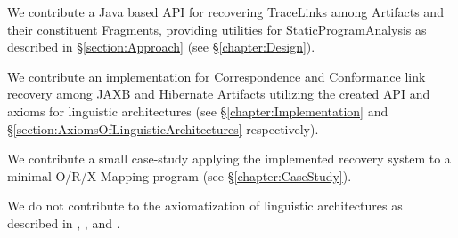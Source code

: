 \begin{contributions}

\item
We contribute a \gls{Java} based \gls{API} for recovering \glspl{TraceLink} among \glspl{Artifact} and their constituent \glspl{Fragment}, providing utilities for \gls{StaticProgramAnalysis} as described in §\ref{section:Approach} (see §\ref{chapter:Design}).

\item
We contribute an implementation for \gls{Correspondence} and \gls{Conformance} link recovery among \gls{JAXB} and \gls{Hibernate} \glspl{Artifact} utilizing the created \gls{API} and axioms for linguistic architectures (see §\ref{chapter:Implementation} and §\ref{section:AxiomsOfLinguisticArchitectures} respectively).

\item
We contribute a small case-study applying the implemented recovery system to a minimal \gls{O/R/X-Mapping} program (see §\ref{chapter:CaseStudy}).

\end{contributions}

\begin{noncontributions}

\item
We do not contribute to the axiomatization of linguistic architectures as described in \cite{DBLP:conf/ecmdafa/LammelV14}, \cite{DBLP:journals/entcs/FavreN05}, \cite{DBLP:conf/sle/Lammel16} and \cite{HeinzLV17}.

\end{noncontributions}

